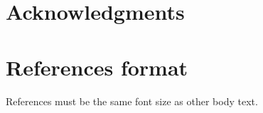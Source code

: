 \documentclass{sigchi}
\begin{document}
%
















\section{Acknowledgments}


%
%
%
%
%
\balance

\section{References format}
References must be the same font size as other body text.



\end{document}

